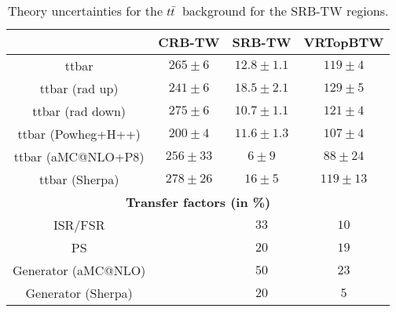 \begin{description}
 \begin{table}[!h]
    \begin{center} \footnotesize
      \begin{tabular}{|c|c|c|c|}
        \hline
        & CRB-TW & SRB-TW & VRTopBTW\\
        \hline
        ttbar&   $265\pm 6 $&    $12.8\pm 1.1 $&         $119\pm 4 $\\
        ttbar (rad up)&          $241\pm 6 $&    $18.5\pm 2.1 $&         $129\pm 5 $\\
        ttbar (rad down)&        $275\pm 6 $&    $10.7\pm 1.1 $&         $121\pm 4 $\\
        ttbar (Powheg+H++)&      $200\pm 4 $&    $11.6\pm 1.3 $&         $107\pm 4 $\\
        ttbar (aMC@NLO+P8)&      $256\pm 33 $&   $6\pm 9 $&      $88\pm 24 $\\
        ttbar (Sherpa)&          $278\pm 26 $&   $16\pm 5 $&     $119\pm 13 $\\
        \hline
        \multicolumn{4}{c}{\bf Transfer factors (in \%)} \\ \hline
        ISR/FSR &   &     $33$&   $10$\\
        PS &   &     $20$&   $19$\\
        Generator (aMC@NLO) & & $50$ & $23$\\
        Generator (Sherpa) & & $20$ & $5$\\        
        \hline       
        \end{tabular}
    \end{center}
    \caption{Theory uncertainties for the $t\bar{t}$\ background for the SRB-TW regions.}
    \label{tab:ttbar_unc_SRB_TW}
  \end{table}


\end{description}
